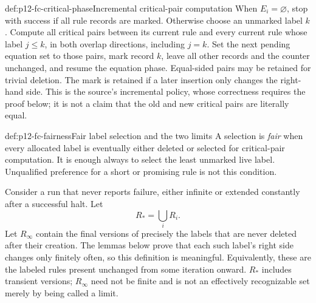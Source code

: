 \begin{hbmethod}{def:p12-fc-critical-phase}{Incremental critical-pair computation}
When \(E_i=\varnothing\), stop with success if all rule records are
marked. Otherwise choose an unmarked label \(k\). Compute all
critical pairs between its current rule and every current rule whose
label \(j\leq k\), in both overlap directions, including \(j=k\).
Set the next pending equation set to those pairs, mark record \(k\),
leave all other records and the counter unchanged, and resume the
equation phase. Equal-sided pairs may be retained for trivial deletion.
The mark is retained if a later insertion only changes the right-hand
side. This is the source's incremental policy, whose correctness
requires the proof below; it is not a claim that the old and new
critical pairs are literally equal.
\end{hbmethod}

\begin{hbdefinition}{def:p12-fc-fairness}{Fair label selection and the two limits}
A selection is \emph{fair} when every allocated label is eventually
either deleted or selected for critical-pair computation. It is enough
always to select the least unmarked live label. Unqualified preference
for a short or promising rule is not this condition.

Consider a run that never reports failure, either infinite or extended
constantly after a successful halt. Let
\[
 R_* =\bigcup_i R_i.
\]
Let \(R_\infty\) contain the final versions of precisely the labels
that are never deleted after their creation. The lemmas below prove
that each such label's right side changes only finitely often, so this
definition is meaningful. Equivalently, these are the labeled rules
present unchanged from some iteration onward. \(R_*\) includes
transient versions; \(R_\infty\) need not be finite and is not an
effectively recognizable set merely by being called a limit.
\end{hbdefinition}

